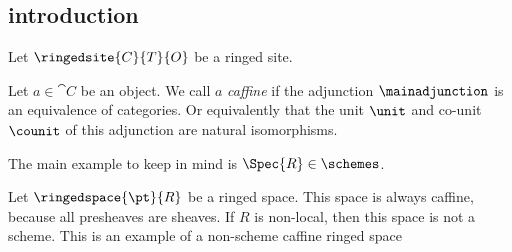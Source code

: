\subsection{introduction}

Let $\ringedsite{C}{T}{O}$ be a ringed site.

\begin{definition}[Caffine]
Let $a\in \cat{C}$ be an object. 
We call $a$ \emph{caffine} if the adjunction $\mainadjunction$ is an equivalence of categories. 
Or equivalently that the unit $\unit$ and co-unit $\counit$ of this adjunction are natural isomorphisms.
\end{definition}

\begin{example}
The main example to keep in mind is $\Spec{R} \in \schemes$.



Let $\ringedspace{\pt}{R}$ be a ringed space. This space is always caffine, because all presheaves are sheaves.
If $R$ is non-local, then this space is not a scheme. This is an example of a non-scheme caffine ringed space
\end{example}